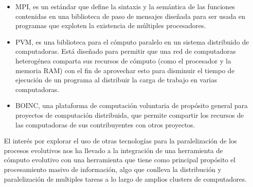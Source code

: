 \begin{itemize}
	\item MPI, es un estándar que define la sintaxis y la semántica de las funciones contenidas en una biblioteca de paso de mensajes diseñada para ser usada en programas que exploten la existencia de múltiples procesadores.
	\item PVM, es una biblioteca para el cómputo paralelo en un sistema distribuido de computadoras. Está diseñado para permitir que una red de computadoras heterogénea comparta sus recursos de cómputo (como el procesador y la memoria RAM) con el fin de aprovechar esto para disminuir el tiempo de ejecución de un programa al distribuir la carga de trabajo en varias computadoras.
	\item BOINC, una plataforma de computación voluntaria de propósito general para proyectos de computación distribuida, que permite compartir los recursos de las computadoras de sus contribuyentes con otros proyectos. 
\end{itemize}

El inter\'es por explorar el uso de otras tecnologías para la paralelizaci\'on de los procesos evolutivos nos ha llevado a la integración de una herramienta de c\'omputo evolutivo con una herramienta que tiene como principal propósito el procesamiento masivo de información, algo que conlleva la distribución y paralelizaci\'on de multiples tareas a lo largo de amplios clusters de computadores.




















